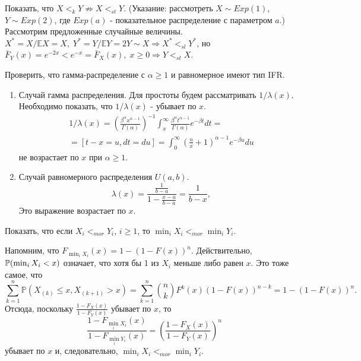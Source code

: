 \problem{}
Показать, что $X <_k Y \not\Rightarrow X <_{st} Y$. (Указание: рассмотреть $X \sim Exp(1)$, $Y \sim Exp(2)$, где $Exp(a)$ - показательное
распределение с параметром $a$.)
\solution{}
Рассмотрим предложенные случайные величины. $X^* = X/\mathbb EX = X, \; Y^* = Y/\mathbb E Y = 2 Y \sim X \Rightarrow X^*<_{sl} Y^*$, но $\bar F_Y(x) = e^{-2x} < e^{-x} = \bar F_X(x), \; x\geq 0 \Rightarrow Y<_{st}X$.

\problem{}
Проверить, что гамма-распределение с $\alpha \geq 1$ и равномерное имеют тип IFR.
\solution{}
\begin{enumerate}
    \item Случай гамма распределения. Для простоты будем рассматривать $1/\lambda(x)$. Необходимо показать, что $1/\lambda(x) $ - убывает по $x$. 
    \begin{multline}
        1/\lambda(x) = \left( \frac{\beta^\alpha x^{\alpha - 1}}{\Gamma(\alpha)} \right)^{-1} \int_x^\infty \frac{\beta^\alpha t^{\alpha - 1}}{\Gamma(\alpha)}e^{-\beta t} dt =\\= \left[ t - x = u, dt = du \right] = \int_0^\infty \left(\frac{u}{x} + 1\right)^{\alpha -1}e^{-\beta u} du
    \end{multline}
        не возрастает по $x$ при $\alpha \geq 1$.

    \item Случай равномерного распределения $U(a,b)$.
    \begin{equation}
        \lambda(x) =\frac{\frac{1}{b-a}}{1 - \frac{x - a}{b - a}} =  \frac{1}{b - x},
    \end{equation}
    Это выражение возрастает по $x$.
\end{enumerate}

\problem{}
Показать, что если $X_i <_{mor} Y_i$, $i \geq 1$, то $\min_i X_i <_{mor} \min_i Y_i$.
\solution{}

Напомним, что $F_{\min_i X_i} (x) = 1 - (1 - F(x))^n$. Действительно, $\P( \min_i X_i < x) $ означает, что хотя бы 1 из $X_i$ меньше либо равен $x$. Это тоже самое, что
    \begin{equation}
        \sum_{k =1}^n \mathbb{P}(X_{(k)} \leq x, X_{(k+1)} > x ) =  \sum_{k=1}^n \binom{n}{k} F^k(x)(1 - F(x))^{n-k} = 1 - (1 - F(x))^n.
    \end{equation}
    Отсюда, поскольку $\frac{1 - F_X(x)}{1 - F_Y(x)}$ убывает по $x$, то 
    \begin{equation}
        \frac{1 - F_{\min_i X_i}(x)}{ 1 - F_{\min_i Y_i}(x)} = \left( \frac{1 - F_X(x)}{ 1 - F_Y(x)} \right)^n
    \end{equation}
    убывает по $x$ и, следовательно, $\min_i X_i <_{mor} \min_i Y_i$.
